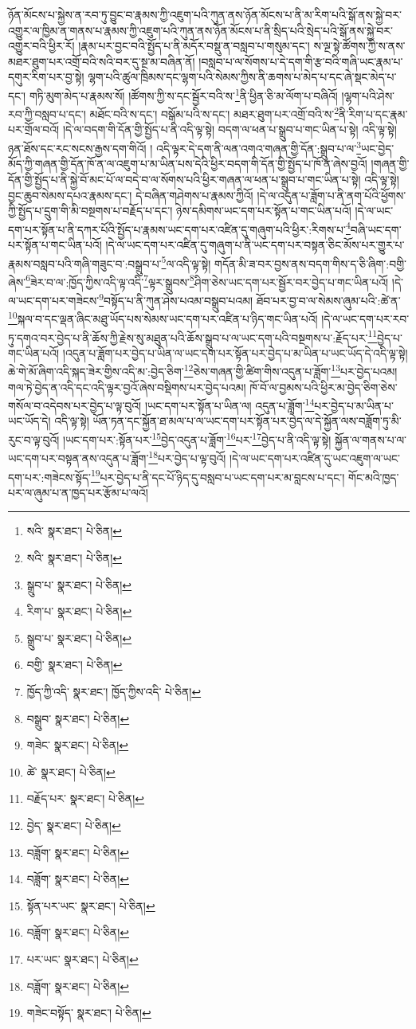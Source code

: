 ཉོན་མོངས་པ་སྐྱེས་ན་རབ་ཏུ་བྱུང་བ་རྣམས་ཀྱི་འཇུག་པའི་ཀུན་ནས་ཉོན་མོངས་པ་ནི་མ་རིག་པའི་སྒོ་ནས་སྐྱེ་བར་འགྱུར་ལ་ཁྱིམ་ན་གནས་པ་རྣམས་ཀྱི་འཇུག་པའི་ཀུན་ནས་ཉོན་མོངས་པ་ནི་སྲིད་པའི་སྲེད་པའི་སྒོ་ནས་སྐྱེ་བར་འགྱུར་བའི་ཕྱིར་རོ། །རྣམ་པར་བྱང་བའི་སྤྱོད་པ་ནི་མདོར་བསྡུ་ན་བསླབ་པ་གསུམ་དང་། ས་ལྔ་སྟེ་ཚོགས་ཀྱི་ས་ནས་མཐར་ཐུག་པར་འགྲོ་བའི་སའི་བར་དུ་སྔ་མ་བཞིན་ནོ། །བསླབ་པ་ལ་སོགས་པ་དེ་དག་གི་རྩ་བའི་གཞི་ཡང་རྣམ་པ་དགུར་རིག་པར་བྱ་སྟེ། ལྷག་པའི་ཚུལ་ཁྲིམས་དང་ལྷག་པའི་སེམས་ཀྱིས་ནི་ཆགས་པ་མེད་པ་དང་ཞེ་སྡང་མེད་པ་དང་། གཏི་མུག་མེད་པ་རྣམས་སོ། །ཚོགས་ཀྱི་ས་དང་སྦྱོར་བའི་ས་\footnote{སའི་  སྣར་ཐང་།  པེ་ཅིན། }ནི་ཕྱིན་ཅི་མ་ལོག་པ་བཞིའོ། །ལྷག་པའི་ཤེས་རབ་ཀྱི་བསླབ་པ་དང་། མཐོང་བའི་ས་དང་། བསྒོམ་པའི་ས་དང་། མཐར་ཐུག་པར་འགྲོ་བའི་ས་\footnote{སའི་  སྣར་ཐང་།  པེ་ཅིན། }ནི་རིག་པ་དང་རྣམ་པར་གྲོལ་བའོ། །དེ་ལ་བདག་གི་དོན་གྱི་སྤྱོད་པ་ནི་འདི་ལྟ་སྟེ། བདག་ལ་ཕན་པ་སྒྲུབ་པ་གང་ཡིན་པ་སྟེ། འདི་ལྟ་སྟེ། ཉན་ཐོས་དང་རང་སངས་རྒྱས་དག་གིའོ། །
འདི་ལྟར་དེ་དག་ནི་ལན་འགའ་གཞན་གྱི་དོན་:སྒྲུབ་པ་ལ་\footnote{སྒྲུབ་པ་  སྣར་ཐང་།  པེ་ཅིན། }ཡང་བྱེད་མོད་ཀྱི་གཞན་གྱི་དོན་ཁོ་ན་ལ་འཇུག་པ་མ་ཡིན་པས་དེའི་ཕྱིར་བདག་གི་དོན་གྱི་སྤྱོད་པ་ཁོ་ན་ཞེས་བྱའོ། །གཞན་གྱི་དོན་གྱི་སྤྱོད་པ་ནི་སྐྱེ་བོ་མང་པོ་ལ་བདེ་བ་ལ་སོགས་པའི་ཕྱིར་གཞན་ལ་ཕན་པ་སྒྲུབ་པ་གང་ཡིན་པ་སྟེ། འདི་ལྟ་སྟེ། བྱང་ཆུབ་སེམས་དཔའ་རྣམས་དང་། དེ་བཞིན་གཤེགས་པ་རྣམས་ཀྱིའོ། །དེ་ལ་འདུན་པ་ཟློག་པ་ནི་ནག་པོའི་ཕྱོགས་ཀྱི་སྤྱོད་པ་དྲུག་གི་མི་བསྔགས་པ་བརྗོད་པ་དང་། ཉེས་དམིགས་ཡང་དག་པར་སྟོན་པ་གང་ཡིན་པའོ། །དེ་ལ་ཡང་དག་པར་སྟོན་པ་ནི་དཀར་པོའི་སྤྱོད་པ་རྣམས་ཡང་དག་པར་འཛིན་དུ་གཞུག་པའི་ཕྱིར་:རིགས་པ་\footnote{རིག་པ་  སྣར་ཐང་།  པེ་ཅིན། }བཞི་ཡང་དག་པར་སྟོན་པ་གང་ཡིན་པའོ། །དེ་ལ་ཡང་དག་པར་འཛིན་དུ་གཞུག་པ་ནི་ཡང་དག་པར་བསྟན་ཅིང་མོས་པར་གྱུར་པ་རྣམས་བསླབ་པའི་གཞི་གཟུང་བ་:བསྒྲུབ་པ་\footnote{སྒྲུབ་པ་  སྣར་ཐང་།  པེ་ཅིན། }ལ་འདི་ལྟ་སྟེ། གདོན་མི་ཟ་བར་བྱས་ནས་བདག་གིས་ད་ཅི་ཞིག་:བགྱི་ཞེས་\footnote{བགྱི་  སྣར་ཐང་།  པེ་ཅིན། }ཟེར་བ་ལ་:ཁྱོད་ཀྱིས་འདི་ལྟ་འདི་\footnote{ཁྱོད་ཀྱི་འདི་  སྣར་ཐང་། ཁྱོད་ཀྱིས་འདི་  པེ་ཅིན། }ལྟར་སྒྲུབས་\footnote{བསྒྲུབ་  སྣར་ཐང་།  པེ་ཅིན། }ཤིག་ཅེས་ཡང་དག་པར་སྦྱོར་བར་བྱེད་པ་གང་ཡིན་པའོ། །དེ་ལ་ཡང་དག་པར་གཟེངས་\footnote{གཟེང་  སྣར་ཐང་།  པེ་ཅིན། }བསྟོད་པ་ནི་ཀུན་ཤེས་པའམ་བསྒྲུབ་པའམ། ཐོབ་པར་བྱ་བ་ལ་སེམས་ཞུམ་པའི་:ཚེ་ན་\footnote{ཚེ་  སྣར་ཐང་།  པེ་ཅིན། }སྐལ་བ་དང་ལྡན་ཞིང་མཐུ་ཡོད་པས་སེམས་ཡང་དག་པར་འཛིན་པ་ཉིད་གང་ཡིན་པའོ། །དེ་ལ་ཡང་དག་པར་རབ་ཏུ་དགའ་བར་བྱེད་པ་ནི་ཆོས་ཀྱི་རྗེས་སུ་མཐུན་པའི་ཆོས་སྒྲུབ་པ་ལ་ཡང་དག་པའི་བསྔགས་པ་:རྗོད་པར་\footnote{བརྗོད་པར་  སྣར་ཐང་།  པེ་ཅིན། }བྱེད་པ་གང་ཡིན་པའོ། །འདུན་པ་ཟློག་པར་བྱེད་པ་ཡིན་ལ་ཡང་དག་པར་སྟོན་པར་བྱེད་པ་མ་ཡིན་པ་ཡང་ཡོད་དེ་འདི་ལྟ་སྟེ། ཆེ་གེ་མོ་ཞིག་འདི་སྐད་ཟེར་གྱིས་འདི་མ་:བྱེད་ཅིག་\footnote{བྱེད་  སྣར་ཐང་།  པེ་ཅིན། }ཅེས་གཞན་གྱི་ཚིག་གིས་འདུན་པ་ཟློག་\footnote{བཟློག་  སྣར་ཐང་།  པེ་ཅིན། }པར་བྱེད་པའམ། གལ་ཏེ་བྱེད་ན་འདི་དང་འདི་ལྟར་བྱའོ་ཞེས་བསྡིགས་པར་བྱེད་པའམ། ཁོ་བོ་ལ་བྱམས་པའི་ཕྱིར་མ་བྱེད་ཅིག་ཅེས་གསོལ་བ་འདེབས་པར་བྱེད་པ་ལྟ་བུའོ། །ཡང་དག་པར་སྟོན་པ་ཡིན་ལ། འདུན་པ་ཟློག་\footnote{བཟློག་  སྣར་ཐང་།  པེ་ཅིན། }པར་བྱེད་པ་མ་ཡིན་པ་ཡང་ཡོད་དེ། འདི་ལྟ་སྟེ། ཡོན་ཏན་དང་སྐྱོན་ཐ་མལ་པ་ལ་ཡང་དག་པར་སྟོན་པར་བྱེད་ལ་དེ་སྐྱོན་ལས་བཟློག་ཏུ་མི་རུང་བ་ལྟ་བུའོ། །ཡང་དག་པར་:སྟོན་པར་\footnote{སྟོན་པར་ཡང་  སྣར་ཐང་།  པེ་ཅིན། }བྱེད་འདུན་པ་ཟློག་\footnote{བཟློག་  སྣར་ཐང་།  པེ་ཅིན། }པར་\footnote{པར་ཡང་  སྣར་ཐང་།  པེ་ཅིན། }བྱེད་པ་ནི་འདི་ལྟ་སྟེ། སྐྱོན་ལ་གནས་པ་ལ་ཡང་དག་པར་བསྟན་ནས་འདུན་པ་ཟློག་\footnote{བཟློག་  སྣར་ཐང་།  པེ་ཅིན། }པར་བྱེད་པ་ལྟ་བུའོ། །དེ་ལ་ཡང་དག་པར་འཛིན་དུ་ཡང་འཇུག་ལ་ཡང་དག་པར་:གཟེངས་སྟོད་\footnote{གཟེང་བསྟོད་  སྣར་ཐང་།  པེ་ཅིན། }པར་བྱེད་པ་ནི་དང་པོ་ཉིད་དུ་བསླབ་པ་ཡང་དག་པར་མ་བླངས་པ་དང་། གོང་མའི་ཁྱད་པར་ལ་ཞུམ་པ་ན་ཁྱད་པར་རྩོམ་པ་ལའོ། 